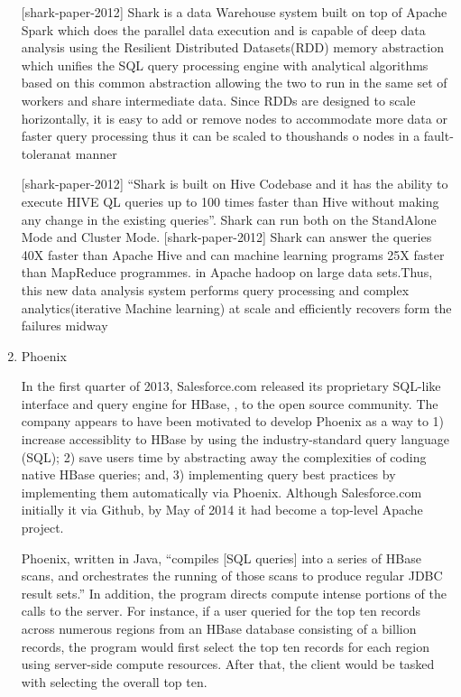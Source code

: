 \begin{enumerate}
{[}shark-paper-2012{]} Shark is a data Warehouse system built
on top of Apache Spark which does the parallel data execution and
is capable of deep data analysis using the Resilient Distributed
Datasets(RDD) memory abstraction which unifies the SQL query
processing engine with analytical algorithms based on this common
abstraction allowing the two to run in the same set of workers
and share intermediate data. Since RDDs are designed to scale
horizontally, it is easy to add or remove nodes to accommodate
more data or faster query processing thus it can be scaled to
thoushands o nodes in a fault-toleranat manner

{[}shark-paper-2012{]} ``Shark is built on Hive Codebase and it
has the ability to execute HIVE QL queries up to 100 times faster
than Hive without making any change in the existing
queries''. Shark can run both on the StandAlone Mode and Cluster
Mode. {[}shark-paper-2012{]} Shark can answer the queries 40X
faster than Apache Hive and can machine learning programs 25X
faster than MapReduce programmes. in Apache hadoop on large data
sets.Thus, this new data analysis system performs query
processing and complex analytics(iterative Machine learning) at
scale and efficiently recovers form the failures midway

\item {} 
Phoenix

In the first quarter of 2013, Salesforce.com released its
proprietary SQL-like interface and query engine for HBase,
, to the open source community.  The company appears to
have been motivated to develop Phoenix as a way to 1) increase
accessiblity to HBase by using the industry-standard query
language (SQL); 2) save users time by abstracting away the
complexities of coding native HBase queries; and, 3) implementing
query best practices by implementing them automatically via
Phoenix. \label{\detokenize{i524/technologies:id217}}{\hyperref[\detokenize{i524/technologies:www-phoenix-cloudera}]{\sphinxcrossref{{[}182{]}}}} Although Salesforce.com
initially  it via Github, by May of 2014 it had
become a top-level Apache project. \label{\detokenize{i524/technologies:id218}}{\hyperref[\detokenize{i524/technologies:www-phoenix-wikipedia}]{\sphinxcrossref{{[}183{]}}}}

Phoenix, written in Java, ``compiles {[}SQL queries{]} into a series
of HBase scans, and orchestrates the running of those scans to
produce regular JDBC result sets.'' \label{\detokenize{i524/technologies:id219}}{\hyperref[\detokenize{i524/technologies:www-apachephoenix-org}]{\sphinxcrossref{{[}184{]}}}}
In addition, the program directs compute intense portions of the
calls to the server.  For instance, if a user queried for the top
ten records across numerous regions from an HBase database
consisting of a billion records, the program would first select
the top ten records for each region using server-side compute
resources.  After that, the client would be tasked with selecting
the overall top ten. \label{\detokenize{i524/technologies:id220}}{\hyperref[\detokenize{i524/technologies:www-phoenix-salesforcedev}]{\sphinxcrossref{{[}185{]}}}}


\end{enumerate}
